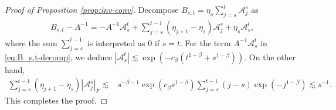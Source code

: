 \documentclass[a4paper,11pt]{article}
\numberwithin{equation}{section}
\theoremstyle{plain}
\theoremstyle{remark}
\begin{document}
\begin{proof}[Proof of Proposition \ref{prop:inv-conv}]
    Decompose $B_{s,t}=\eta_s \sum_{j=s}^t \mathcal{A}_j^s$ as 
    \begin{align}
        B_{s,t} - A^{-1} = -A^{-1}\mathcal{A}_s^t + \sum_{j=s}^{t-1} (\eta_{j+1} - \eta_s)\mathcal{A}_j^s + \eta_s \mathcal{A}_s^t, \label{eq:B_s,t-decomp}
    \end{align}
    where the sum $\sum_{j=s}^{t-1}$ is interpreted as $0$ if $s=t$. For the term $A^{-1}\mathcal{A}_s^t$ in \eqref{eq:B_s,t-decomp}, we deduce  $|\mathcal{A}_s^t| \lesssim \exp(-c_{\beta}(t^{1-\beta} + s^{1-\beta}))$. On the other hand, 
    \begin{align*}
         \sum_{j=s}^{t-1} (\eta_{j+1} - \eta_s)|\mathcal{A}_j^s|_F \lesssim & s^{-\beta-1} \exp(c_{\beta}s^{1-\beta})  \sum_{j=s}^{t-1} (j-s)\exp(-j^{1-\beta}) \lesssim s^{-1}.
    \end{align*}
    This completes the proof. 
\end{proof}
\end{document}

